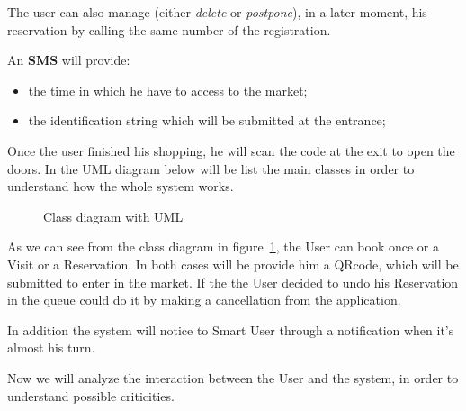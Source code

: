 The user can also manage (either \textit{delete} or \textit{postpone}), in a later moment, his reservation by calling the same number of the registration.



An \textbf{SMS} will provide:
\begin{itemize}
\item the time in which he have to access to the market;
\item the identification string which will be submitted at the entrance;
\end{itemize}

Once the user finished his shopping, he will scan the code at the exit to open the doors.
\bigskip
In the UML diagram below will be list the main classes in order to understand how the whole system works.

\par 
\bigskip
\bigskip
\begin{figure}[H]
  \label{fig:UML}
  \centering
  \caption{Class diagram with UML}
\end{figure}



\par 
\medskip
As we can see from the class diagram in figure~\ref{fig:UML}, the User can book once or a Visit or a Reservation.
In both cases will be provide him a QRcode, which will be submitted to enter in the market. 
If the the User decided to undo his Reservation in the queue could do it by making a cancellation from the application. 
\par
\medskip

In addition the system will notice to Smart User through a notification  when it's almost his turn.

Now we will analyze the interaction between the User and the system, in order to understand possible criticities.
\par 
\bigskip

